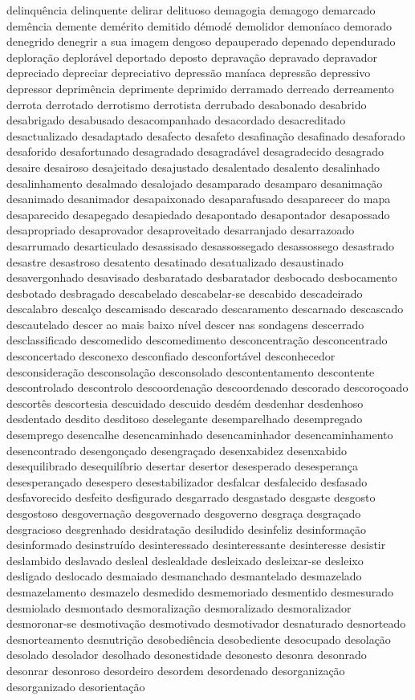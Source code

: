 \documentclass[ruledheader]{abnt_UFF}
\begin{document}
delinqu\^{e}ncia delinquente delirar delituoso demagogia demagogo demarcado dem\^{e}ncia demente dem\'{e}rito demitido d\'{e}mod\'{e} demolidor demon\'{i}aco demorado denegrido denegrir a sua imagem dengoso depauperado depenado dependurado deplora\c{c}\~ao deplor\'{a}vel deportado deposto deprava\c{c}\~ao depravado depravador depreciado depreciar depreciativo depress\~ao man\'{i}aca depress\~ao depressivo depressor deprim\^{e}ncia deprimente deprimido derramado derreado derreamento derrota derrotado derrotismo derrotista derrubado desabonado desabrido desabrigado desabusado desacompanhado desacordado desacreditado desactualizado desadaptado desafecto desafeto desafina\c{c}\~ao desafinado desaforado desaforido desafortunado desagradado desagrad\'{a}vel desagradecido desagrado desaire desairoso desajeitado desajustado desalentado desalento desalinhado desalinhamento desalmado desalojado desamparado desamparo desanima\c{c}\~ao desanimado desanimador desapaixonado desaparafusado desaparecer do mapa desaparecido desapegado desapiedado desapontado desapontador desapossado desapropriado desaprovador desaproveitado desarranjado desarrazoado desarrumado desarticulado desassisado desassossegado desassossego desastrado desastre desastroso desatento desatinado desatualizado desaustinado desavergonhado desavisado desbaratado desbaratador desbocado desbocamento desbotado desbragado descabelado descabelar-se descabido descadeirado descalabro descal\c{c}o descamisado descarado descaramento descarnado descascado descautelado descer ao mais baixo n\'{i}vel descer nas sondagens descerrado desclassificado descomedido descomedimento desconcentra\c{c}\~ao desconcentrado desconcertado desconexo desconfiado desconfort\'{a}vel desconhecedor desconsidera\c{c}\~ao desconsola\c{c}\~ao desconsolado descontentamento descontente descontrolado descontrolo descoordena\c{c}\~ao descoordenado descorado descoro\c{c}oado descort\^{e}s descortesia descuidado descuido desd\'{e}m desdenhar desdenhoso desdentado desdito desditoso deselegante desemparelhado desempregado desemprego desencalhe desencaminhado desencaminhador desencaminhamento desencontrado desengon\c{c}ado desengra\c{c}ado desenxabidez desenxabido desequilibrado desequil\'{i}brio desertar desertor desesperado desesperan\c{c}a desesperan\c{c}ado desespero desestabilizador desfalcar desfalecido desfasado desfavorecido desfeito desfigurado desgarrado desgastado desgaste desgosto desgostoso desgoverna\c{c}\~ao desgovernado desgoverno desgra\c{c}a desgra\c{c}ado desgracioso desgrenhado desidrata\c{c}\~ao desiludido desinfeliz desinforma\c{c}\~ao desinformado desinstru\'{i}do desinteressado desinteressante desinteresse desistir deslambido deslavado desleal deslealdade desleixado desleixar-se desleixo desligado deslocado desmaiado desmanchado desmantelado desmazelado desmazelamento desmazelo desmedido desmemoriado desmentido desmesurado desmiolado desmontado desmoraliza\c{c}\~ao desmoralizado desmoralizador desmoronar-se desmotiva\c{c}\~ao desmotivado desmotivador desnaturado desnorteado desnorteamento desnutri\c{c}\~ao desobedi\^{e}ncia desobediente desocupado desola\c{c}\~ao desolado desolador desolhado desonestidade desonesto desonra desonrado desonrar desonroso desordeiro desordem desordenado desorganiza\c{c}\~ao desorganizado desorienta\c{c}\~ao 
\end{document}
